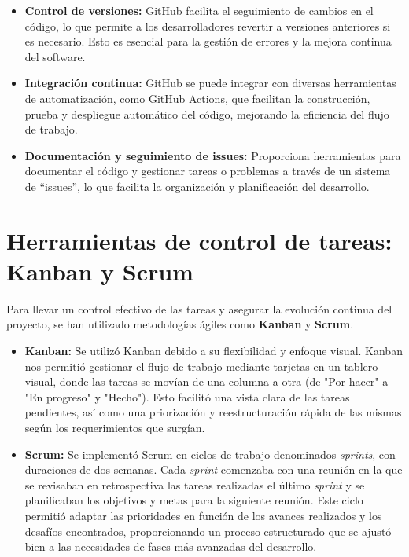 \begin{itemize}
    \item \textbf{Control de versiones:} GitHub facilita el seguimiento de cambios en el código, lo que permite a los desarrolladores revertir a versiones anteriores si es necesario. Esto es esencial para la gestión de errores y la mejora continua del software.
    \item \textbf{Integración continua:} GitHub se puede integrar con diversas herramientas de automatización, como GitHub Actions, que facilitan la construcción, prueba y despliegue automático del código, mejorando la eficiencia del flujo de trabajo.
    \item \textbf{Documentación y seguimiento de issues:} Proporciona herramientas para documentar el código y gestionar tareas o problemas a través de un sistema de “issues”, lo que facilita la organización y planificación del desarrollo.
\end{itemize}


\section{Herramientas de control de tareas: Kanban y Scrum}

Para llevar un control efectivo de las tareas y asegurar la evolución continua del proyecto, se han utilizado metodologías ágiles como \textbf{Kanban} y \textbf{Scrum}.

\begin{itemize}
    \item \textbf{Kanban:} Se utilizó Kanban debido a su flexibilidad y enfoque visual. Kanban nos permitió gestionar el flujo de trabajo mediante tarjetas en un tablero visual, donde las tareas se movían de una columna a otra (de "Por hacer" a "En progreso" y "Hecho"). Esto facilitó una vista clara de las tareas pendientes, así como una priorización y reestructuración rápida de las mismas según los requerimientos que surgían.
    
    \item \textbf{Scrum:} Se implementó Scrum en ciclos de trabajo denominados \textit{sprints}, con duraciones de dos semanas. Cada \textit{sprint} comenzaba con una reunión en la que se revisaban en retrospectiva las tareas realizadas el último \textit{sprint} y se planificaban los objetivos y metas para la siguiente reunión. Este ciclo permitió adaptar las prioridades en función de los avances realizados y los desafíos encontrados, proporcionando un proceso estructurado que se ajustó bien a las necesidades de fases más avanzadas del desarrollo.
\end{itemize}

